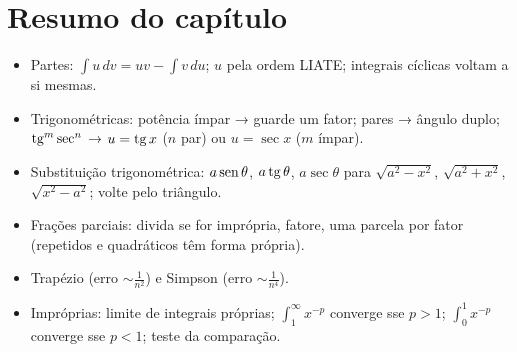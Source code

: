 \section*{Resumo do capítulo}
\begin{itemize}
\item Partes: $\int u\,dv=uv-\int v\,du$; $u$ pela ordem LIATE; integrais cíclicas voltam a si
  mesmas.
\item Trigonométricas: potência ímpar → guarde um fator; pares → ângulo duplo;
  $\operatorname{tg}^m\sec^n$ → $u=\operatorname{tg} x$ ($n$ par) ou $u=\sec x$ ($m$ ímpar).
\item Substituição trigonométrica: $a\operatorname{sen}\theta$, $a\operatorname{tg}\theta$, $a\sec\theta$ para
  $\sqrt{a^2-x^2}$, $\sqrt{a^2+x^2}$, $\sqrt{x^2-a^2}$; volte pelo triângulo.
\item Frações parciais: divida se for imprópria, fatore, uma parcela por fator (repetidos e
  quadráticos têm forma própria).
\item Trapézio (erro $\sim\frac1{n^2}$) e Simpson (erro $\sim\frac1{n^4}$).
\item Impróprias: limite de integrais próprias; $\int_1^\infty x^{-p}$ converge sse $p>1$;
  $\int_0^1x^{-p}$ converge sse $p<1$; teste da comparação.
\end{itemize}


